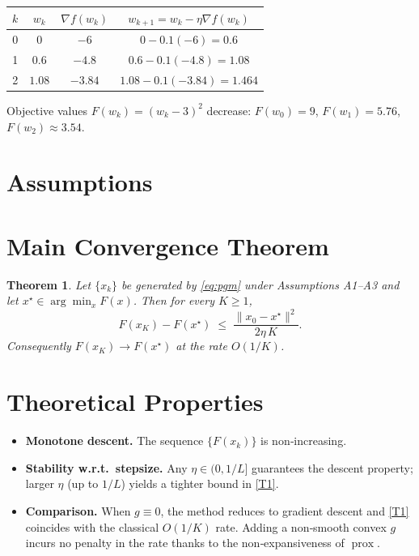 \documentclass{article}
\newtheorem{theorem}{Theorem}
\newcommand{\prox}{\operatorname{prox}}
\newcommand{\grad}{\nabla}
\newcommand{\R}{\mathbb{R}}
\begin{document}
\begin{center}
\begin{tabular}{c|c|c|c}
$k$ & $w_{k}$ & $\grad f(w_{k})$ & $w_{k+1}=w_{k}-\eta\grad f(w_{k})$\\\hline
0 & $0$ & $-6$ & $0-0.1(-6)=0.6$\\
1 & $0.6$ & $-4.8$ & $0.6-0.1(-4.8)=1.08$\\
2 & $1.08$ & $-3.84$ & $1.08-0.1(-3.84)=1.464$\\
\end{tabular}
\end{center}
Objective values $F(w_{k})=(w_{k}-3)^{2}$ decrease:
$F(w_{0})=9$, $F(w_{1})=5.76$, $F(w_{2})\approx3.54$.

\newpage
\section*{Assumptions}

\section*{Main Convergence Theorem}
\begin{theorem}
\label{thm:pgm}
Let $\{x_{k}\}$ be generated by \eqref{eq:pgm} under Assumptions A1–A3 and let $x^{\star}\in\arg\min_{x}F(x)$. Then for every $K\ge1$,
\[
F(x_{K})-F(x^{\star})\;\le\;\frac{\|x_{0}-x^{\star}\|^{2}}{2\eta\,K}.
\tag{T1}
\]
Consequently $F(x_{K})\to F(x^{\star})$ at the rate $O(1/K)$.
\end{theorem}

\section*{Theoretical Properties}
\begin{itemize}[noitemsep]
\item \textbf{Monotone descent.} The sequence $\{F(x_{k})\}$ is non‑increasing.
\item \textbf{Stability w.r.t.\ stepsize.} Any $\eta\in(0,1/L]$ guarantees the descent property; larger $\eta$ (up to $1/L$) yields a tighter bound in \eqref{T1}.
\item \textbf{Comparison.} When $g\equiv0$, the method reduces to gradient descent and \eqref{T1} coincides with the classical $O(1/K)$ rate. Adding a non‑smooth convex $g$ incurs no penalty in the rate thanks to the non‑expansiveness of $\prox$.
\end{itemize}
\end{document}
